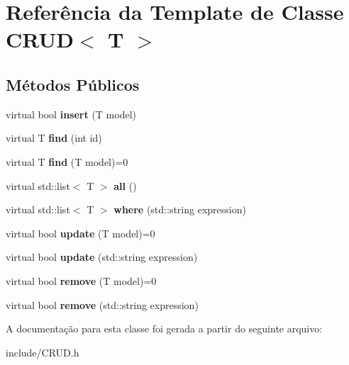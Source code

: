 \hypertarget{classCRUD}{}\section{Referência da Template de Classe C\+R\+UD$<$ T $>$}
\label{classCRUD}
\subsection*{Métodos Públicos}
\begin{DoxyCompactItemize}
\item 
\mbox{\label{classCRUD_a30cd14f7dc11891d17ec3689af848e16}} 
virtual bool {\bfseries insert} (T model)
\item 
\mbox{\label{classCRUD_a3fbedd94140ce2060253697df8b2709c}} 
virtual T {\bfseries find} (int id)
\item 
\mbox{\label{classCRUD_a7a84f07fe0126380ea8f94663ccf545a}} 
virtual T {\bfseries find} (T model)=0
\item 
\mbox{\label{classCRUD_ac807842ac439dbff394d1859545df13e}} 
virtual std\+::list$<$ T $>$ {\bfseries all} ()
\item 
\mbox{\label{classCRUD_aed7f958bbb2272979761c66a35c659ba}} 
virtual std\+::list$<$ T $>$ {\bfseries where} (std\+::string expression)
\item 
\mbox{\label{classCRUD_a82535c1981ba191ef2c3a231186ea36c}} 
virtual bool {\bfseries update} (T model)=0
\item 
\mbox{\label{classCRUD_a9d9242275dca45b489261cbe48df5c0e}} 
virtual bool {\bfseries update} (std\+::string expression)
\item 
\mbox{\label{classCRUD_a556bb5156fb79e6232d5895ce31af05c}} 
virtual bool {\bfseries remove} (T model)=0
\item 
\mbox{\label{classCRUD_a89998ade773b3e141a2cb86256e41d0d}} 
virtual bool {\bfseries remove} (std\+::string expression)
\end{DoxyCompactItemize}


A documentação para esta classe foi gerada a partir do seguinte arquivo\+:\begin{DoxyCompactItemize}
\item 
include/C\+R\+U\+D.\+h\end{DoxyCompactItemize}

